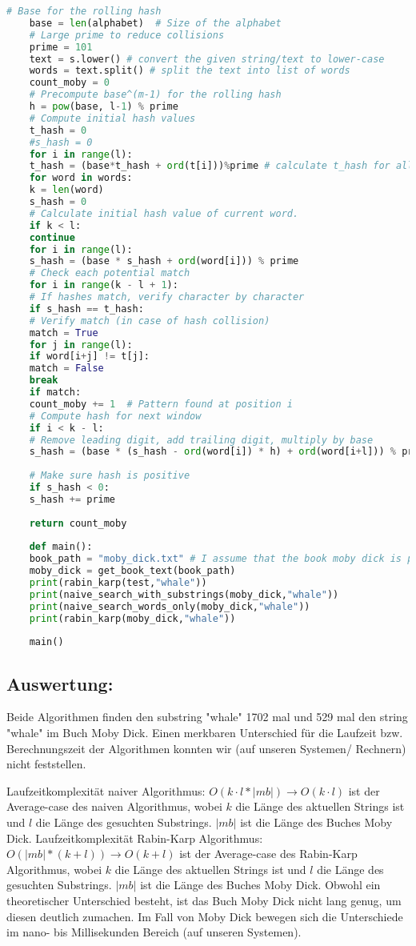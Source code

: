\begin{lstlisting}[language=Python]
	# Base for the rolling hash
	base = len(alphabet)  # Size of the alphabet
	# Large prime to reduce collisions
	prime = 101
	text = s.lower() # convert the given string/text to lower-case
	words = text.split() # split the text into list of words 
	count_moby = 0
	# Precompute base^(m-1) for the rolling hash
	h = pow(base, l-1) % prime
	# Compute initial hash values
	t_hash = 0
	#s_hash = 0
	for i in range(l):
	t_hash = (base*t_hash + ord(t[i]))%prime # calculate t_hash for all words in s.
	for word in words:
	k = len(word)
	s_hash = 0
	# Calculate initial hash value of current word.
	if k < l:
	continue
	for i in range(l):
	s_hash = (base * s_hash + ord(word[i])) % prime
	# Check each potential match
	for i in range(k - l + 1):
	# If hashes match, verify character by character
	if s_hash == t_hash:
	# Verify match (in case of hash collision)
	match = True
	for j in range(l):
	if word[i+j] != t[j]:
	match = False
	break
	if match:
	count_moby += 1  # Pattern found at position i
	# Compute hash for next window
	if i < k - l:
	# Remove leading digit, add trailing digit, multiply by base
	s_hash = (base * (s_hash - ord(word[i]) * h) + ord(word[i+l])) % prime
	
	# Make sure hash is positive
	if s_hash < 0:
	s_hash += prime
	
	return count_moby
	
	def main():
	book_path = "moby_dick.txt" # I assume that the book moby dick is present as a .txt file in the same directory as the code.
	moby_dick = get_book_text(book_path)
	print(rabin_karp(test,"whale"))
	print(naive_search_with_substrings(moby_dick,"whale"))
	print(naive_search_words_only(moby_dick,"whale"))
	print(rabin_karp(moby_dick,"whale"))
	
	main()
\end{lstlisting}

\newpage
\subsection{Auswertung:}
Beide Algorithmen finden den substring "whale" 1702 mal und 529 mal den string "whale" im Buch Moby Dick. Einen merkbaren Unterschied für die Laufzeit bzw. Berechnungszeit der Algorithmen konnten wir (auf unseren Systemen/ Rechnern) nicht feststellen. 

Laufzeitkomplexität naiver Algorithmus: $O(k·l*|mb|) \rightarrow O(k·l)$ ist der Average-case des naiven Algorithmus, wobei $k$ die Länge des aktuellen Strings ist und $l$ die Länge des gesuchten Substrings. $|mb|$ ist die Länge des Buches Moby Dick. Laufzeitkomplexität Rabin-Karp Algorithmus: $O(|mb|*(k+l)) \rightarrow O(k+l)$ ist der Average-case des Rabin-Karp Algorithmus, wobei $k$ die Länge des aktuellen Strings ist und $l$ die Länge des gesuchten Substrings. $|mb|$ ist die Länge des Buches Moby Dick. Obwohl ein theoretischer Unterschied besteht, ist das Buch Moby Dick nicht lang genug, um diesen deutlich zumachen. Im Fall von Moby Dick bewegen sich die Unterschiede im nano- bis Millisekunden Bereich (auf unseren Systemen).